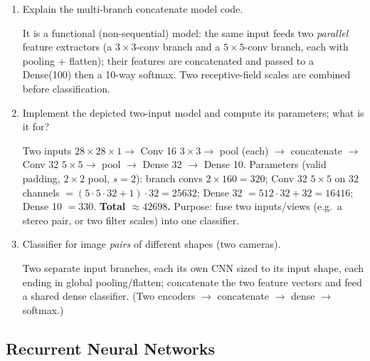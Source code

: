 \documentclass[10pt,a4paper]{article}
\newcommand{\q}[1]{\item #1}
\begin{document}
\begin{enumerate}[leftmargin=*,label=\textbf{Q\arabic*.}]

\q Explain the multi-branch concatenate model code.
\begin{answerbox}
It is a functional (non-sequential) model: the same input feeds two \emph{parallel} feature extractors (a $3\times3$-conv branch and a $5\times5$-conv branch, each with pooling + flatten); their features are concatenated and passed to a Dense(100) then a 10-way softmax. Two receptive-field scales are combined before classification.
\end{answerbox}

\q Implement the depicted two-input model and compute its parameters; what is it for?
\begin{answerbox}
Two inputs $28\times28\times1 \to$ Conv 16 $3\times3 \to$ pool (each) $\to$ concatenate $\to$ Conv 32 $5\times5 \to$ pool $\to$ Dense 32 $\to$ Dense 10. Parameters (valid padding, $2\times2$ pool, $s{=}2$): branch convs $2\times160=320$; Conv 32 $5\times5$ on 32 channels $=(5\cdot5\cdot32+1)\cdot32=25632$; Dense 32 $=512\cdot32+32=16416$; Dense 10 $=330$. \textbf{Total $\approx 42698$.} Purpose: fuse two inputs/views (e.g.\ a stereo pair, or two filter scales) into one classifier.
\end{answerbox}

\q Classifier for image \emph{pairs} of different shapes (two cameras).
\begin{answerbox}
Two separate input branches, each its own CNN sized to its input shape, each ending in global pooling/flatten; concatenate the two feature vectors and feed a shared dense classifier. (Two encoders $\to$ concatenate $\to$ dense $\to$ softmax.)
\end{answerbox}

\end{enumerate}

\subsection{Recurrent Neural Networks}
\end{document}
